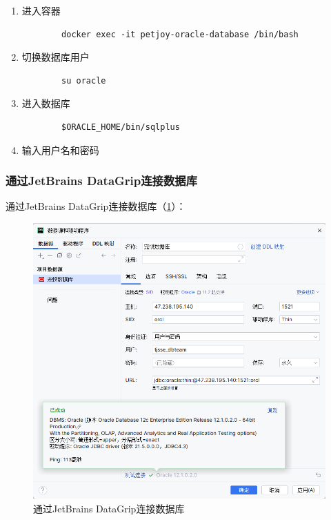 \begin{enumerate}
	\item 进入容器
	\begin{verbatim}
		docker exec -it petjoy-oracle-database /bin/bash
	\end{verbatim}
	\item 切换数据库用户
	\begin{verbatim}
		su oracle
	\end{verbatim}
	\item 进入数据库
	\begin{verbatim}
		$ORACLE_HOME/bin/sqlplus
	\end{verbatim}
	\item 输入用户名和密码
\end{enumerate}

\subsubsection{通过JetBrains DataGrip连接数据库}

通过JetBrains DataGrip连接数据库（\cref{fig:ConnectViaDataGrip}）：

\begin{figure}[htbp]
	\centering
	\includegraphics[width=\textwidth]{figures/ConnectViaDataGrip.png}
	\caption{通过JetBrains DataGrip连接数据库}
	\label{fig:ConnectViaDataGrip}
\end{figure}

